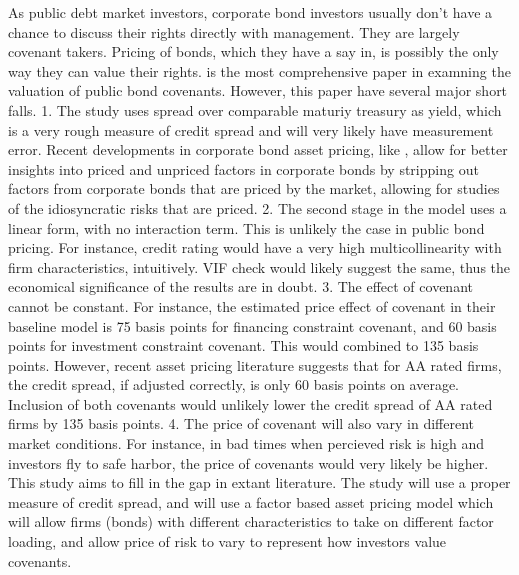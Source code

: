 \documentclass[a4paper, 10pt, authoryear]{elsarticle}
\begin{document}
As public debt market investors, corporate bond investors usually don't have a chance to discuss their rights directly with management. They are largely covenant takers. Pricing of bonds, which they have a say in, is possibly the only way they can value their rights. \cite{reiselValueRestrictiveCovenants2014a} is the most comprehensive paper in examning the valuation of public bond covenants. However, this paper have several major short falls. 1. The study uses spread over comparable maturiy treasury as yield, which is a very rough measure of credit spread and will very likely have measurement error. Recent developments in corporate bond asset pricing, like \cite{vanbinsbergenDurationBasedValuationCorporate2025}, allow for better insights into priced and unpriced factors in corporate bonds by stripping out factors from corporate bonds that are priced by the market, allowing for studies of the idiosyncratic risks that are priced. 2. The second stage in the model uses a linear form, with no interaction term. This is unlikely the case in public bond pricing. For instance, credit rating would have a very high multicollinearity with firm characteristics, intuitively. VIF check would likely suggest the same, thus the economical significance of the results are in doubt. 3. The effect of covenant cannot be constant. For instance, the estimated price effect of covenant in their baseline model is 75 basis points for financing constraint covenant, and 60 basis points for investment constraint covenant. This would combined to 135 basis points. However, recent asset pricing literature suggests that for AA rated firms, the credit spread, if adjusted correctly, is only 60 basis points on average. Inclusion of both covenants would unlikely lower the credit spread of AA rated firms by 135 basis points. 4. The price of covenant will also vary in different market conditions. For instance, in bad times when percieved risk is high and investors fly to safe harbor, the price of covenants would very likely be higher.
\newline
This study aims to fill in the gap in extant literature. The study will use a proper measure of credit spread, and will use a factor based asset pricing model which will allow firms (bonds) with different characteristics to take on different factor loading, and allow price of risk to vary to represent how investors value covenants.
\end{document}
